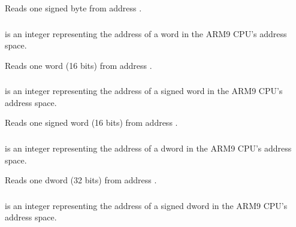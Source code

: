 \documentclass[letterpaper,10pt,english]{sphinxmanual}
\begin{document}
\sphinxAtStartPar
Reads one signed byte from address .


\subsubsection{}
\label{\detokenize{mods:memory-readword-address}}\label{\detokenize{mods:readword}}
\sphinxAtStartPar
{} is an integer representing the address of a word in the ARM9 CPU’s address space.

\sphinxAtStartPar
Reads one word (16 bits) from address .


\subsubsection{}
\label{\detokenize{mods:memory-readwordsigned-address}}\label{\detokenize{mods:readwordsigned}}
\sphinxAtStartPar
{} is an integer representing the address of a signed word in the ARM9 CPU’s address space.

\sphinxAtStartPar
Reads one signed word (16 bits) from address .


\subsubsection{}
\label{\detokenize{mods:memory-readdword-address}}\label{\detokenize{mods:readdword}}
\sphinxAtStartPar
{} is an integer representing the address of a dword in the ARM9 CPU’s address space.

\sphinxAtStartPar
Reads one dword (32 bits) from address .


\subsubsection{}
\label{\detokenize{mods:memory-readdwordsigned-address}}\label{\detokenize{mods:readdwordsigned}}
\sphinxAtStartPar
{} is an integer representing the address of a signed dword in the ARM9 CPU’s address space.
\end{document}

